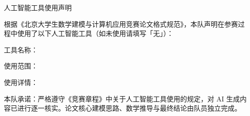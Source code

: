 \clearpage
\thispagestyle{plain}

\begin{center}
  {\heiti{} 人工智能工具使用声明}
\end{center}

\vspace{1em}

\noindent 根据《北京大学生数学建模与计算机应用竞赛论文格式规范》，本队声明在参赛过程中使用了以下人工智能工具（如未使用请填写「无」）：

\vspace{0.8em}

\noindent 工具名称：\underline{}

\vspace{0.5em}

\noindent 使用范围：\underline{}

\vspace{0.5em}

\noindent 使用详情：\underline{}

\vspace{1.2em}

\noindent 本队承诺：严格遵守《竞赛章程》中关于人工智能工具使用的规定，对 AI 生成内容已进行逐一核实。论文核心建模思路、数学推导与最终结论由队员独立完成。

\vfill
